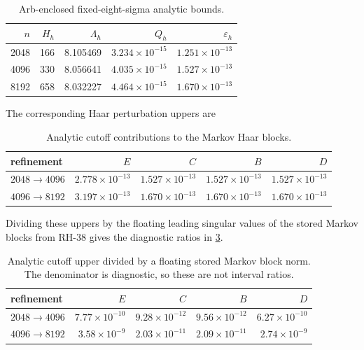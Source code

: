 \documentclass[11pt]{article}
\theoremstyle{definition}
\theoremstyle{remark}
\begin{document}
\begin{table}[H]
\centering
\caption{Arb-enclosed fixed-eight-sigma analytic bounds.}
\label{tab:arb}
\begin{tabular}{rrrrr}
\toprule
$n$ & $H_h$ & $\Lambda_h$ & $Q_h$ & $\varepsilon_h$\\
\midrule
2048 & 166 & 8.105469 & $3.234\times10^{-15}$ & $1.251\times10^{-13}$\\
4096 & 330 & 8.056641 & $4.035\times10^{-15}$ & $1.527\times10^{-13}$\\
8192 & 658 & 8.032227 & $4.464\times10^{-15}$ & $1.670\times10^{-13}$\\
\bottomrule
\end{tabular}
\end{table}

The corresponding Haar perturbation uppers are
\begin{table}[H]
\centering
\caption{Analytic cutoff contributions to the Markov Haar blocks.}
\label{tab:haar-cutoff}
\begin{tabular}{lrrrr}
\toprule
refinement & $E$ & $C$ & $B$ & $D$\\
\midrule
$2048\to4096$
& $2.778\times10^{-13}$
& $1.527\times10^{-13}$
& $1.527\times10^{-13}$
& $1.527\times10^{-13}$\\
$4096\to8192$
& $3.197\times10^{-13}$
& $1.670\times10^{-13}$
& $1.670\times10^{-13}$
& $1.670\times10^{-13}$\\
\bottomrule
\end{tabular}
\end{table}

Dividing these uppers by the floating leading singular values of the stored
Markov blocks from RH-38 gives the diagnostic ratios in
\cref{tab:relative}.

\begin{table}[H]
\centering
\caption{Analytic cutoff upper divided by a floating stored Markov block norm.
The denominator is diagnostic, so these are not interval ratios.}
\label{tab:relative}
\begin{tabular}{lrrrr}
\toprule
refinement & $E$ & $C$ & $B$ & $D$\\
\midrule
$2048\to4096$
& $7.77\times10^{-10}$ & $9.28\times10^{-12}$
& $9.56\times10^{-12}$ & $6.27\times10^{-10}$\\
$4096\to8192$
& $3.58\times10^{-9}$ & $2.03\times10^{-11}$
& $2.09\times10^{-11}$ & $2.74\times10^{-9}$\\
\bottomrule
\end{tabular}
\end{table}
\end{document}
